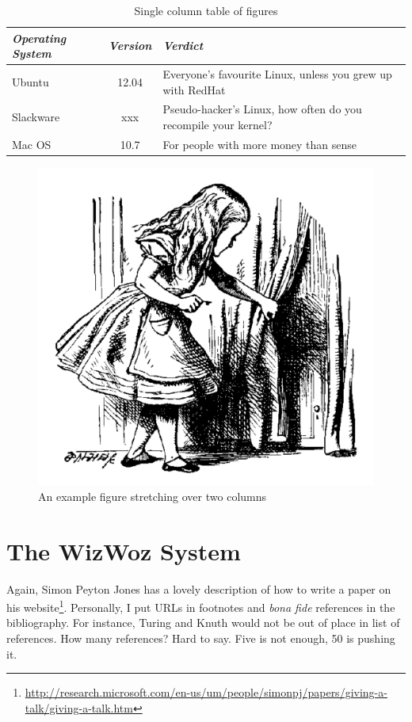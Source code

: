 \documentclass{mpaper}
\begin{document}
\begin{table}
\begin{tabular}{l||c||p{2cm}}
\emph{Operating System} & \emph{Version} & \emph{Verdict} \\ \hline \hline
Ubuntu & 12.04 & Everyone's favourite Linux, unless you grew up with
RedHat \\ \hline
Slackware & xxx & Pseudo-hacker's Linux, how often do you recompile
your kernel? \\ \hline
Mac OS & 10.7 & For people with more money than sense \\ \hline
\end{tabular}
\caption{\label{tab-eg}Single column table of figures}
\end{table}

\begin{figure}
\begin{center}
\includegraphics[scale=0.3]{alice.pdf}
\end{center}
\caption{\label{fig-eg}An example figure stretching over two columns}
\end{figure}

\section{The WizWoz System}

Again, Simon Peyton Jones has a lovely description of how to write a
paper on his
website\footnote{\url{http://research.microsoft.com/en-us/um/people/simonpj/papers/giving-a-talk/giving-a-talk.htm}}.
Personally, I put URLs in footnotes and \emph{bona fide} references
in the bibliography. For instance, Turing \cite{turing37computable}
and Knuth \cite{knuth68art} would not be out of place in list of
references.
How many references? Hard to say. Five is not enough, 50 is pushing
it.
\end{document}
